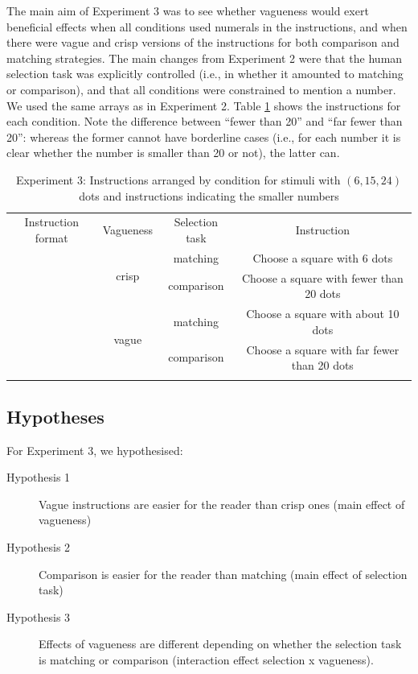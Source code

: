The main aim of Experiment 3 was to see whether vagueness would exert beneficial effects when all conditions used numerals in the instructions, and when there were vague and crisp versions of the instructions for both comparison and matching strategies. The main changes from Experiment 2 were that the human selection task was explicitly controlled (i.e., in whether it amounted to matching or comparison), and that all conditions were constrained to mention a number. We used the same arrays as in Experiment 2. Table \ref{Instructions for e3} shows the instructions for each condition. Note the difference between ``fewer than 20'' and ``far fewer than 20'': whereas the former cannot have borderline cases (i.e., for each number it is clear whether the number is smaller than 20 or not), the latter can.

\begin{table}
\centering
\caption{Experiment 3: Instructions arranged by condition for stimuli with $(6,15,24)$ dots and instructions indicating the smaller numbers} 
\label{Instructions for e3}
\begin{tabular}{cccc}
\hline\noalign{\smallskip}
Instruction	format          &Vagueness					&	Selection task	& Instruction									\\
\noalign{\smallskip}\hline\noalign{\smallskip}
\multirow{4}{*}{numeric}	&\multirow{2}{*}{crisp} 	&	matching		& Choose a square with 6 dots 					\\ 
							&							&	comparison 		& Choose a square with fewer than 20 dots 		\\
                             \cline{2-4}
							&\multirow{2}{*}{vague} 	&	matching 		& Choose a square with about 10 dots 			\\ 
							&							&	comparison 		& Choose a square with far fewer than 20 dots 	\\ 
\noalign{\smallskip}\hline
\end{tabular}
\end{table}%

\subsection{Hypotheses} %
\noindent For Experiment 3, we hypothesised:

\begin{description}
	\item [Hypothesis 1] Vague instructions are easier for the reader than crisp ones (main effect of vagueness)
	\item [Hypothesis 2] Comparison is easier for the reader than matching (main effect of selection task)
	\item [Hypothesis 3] Effects of vagueness are different depending on whether the selection task is matching or comparison (interaction effect selection x vagueness).
\end{description}


